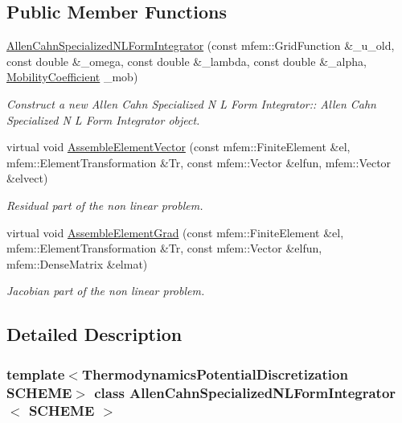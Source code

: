 \subsection*{Public Member Functions}
\begin{DoxyCompactItemize}
\item 
\hyperlink{classAllenCahnSpecializedNLFormIntegrator_abb6bd9b866d9d5777cd4f72d7aceb6c1}{Allen\+Cahn\+Specialized\+N\+L\+Form\+Integrator} (const mfem\+::\+Grid\+Function \&\+\_\+u\+\_\+old, const double \&\+\_\+omega, const double \&\+\_\+lambda, const double \&\+\_\+alpha, \hyperlink{classMobilityCoefficient}{Mobility\+Coefficient} \+\_\+mob)
\begin{DoxyCompactList}\small\item\em Construct a new Allen Cahn Specialized N L Form Integrator\+:\+: Allen Cahn Specialized N L Form Integrator object. \end{DoxyCompactList}\item 
virtual void \hyperlink{classAllenCahnSpecializedNLFormIntegrator_a8bcdb2dcc40d2218465b7dd2d816990d}{Assemble\+Element\+Vector} (const mfem\+::\+Finite\+Element \&el, mfem\+::\+Element\+Transformation \&Tr, const mfem\+::\+Vector \&elfun, mfem\+::\+Vector \&elvect)
\begin{DoxyCompactList}\small\item\em Residual part of the non linear problem. \end{DoxyCompactList}\item 
virtual void \hyperlink{classAllenCahnSpecializedNLFormIntegrator_ad770c969c54e85b5e96cd284adda3f06}{Assemble\+Element\+Grad} (const mfem\+::\+Finite\+Element \&el, mfem\+::\+Element\+Transformation \&Tr, const mfem\+::\+Vector \&elfun, mfem\+::\+Dense\+Matrix \&elmat)
\begin{DoxyCompactList}\small\item\em Jacobian part of the non linear problem. \end{DoxyCompactList}\end{DoxyCompactItemize}


\subsection{Detailed Description}
\subsubsection*{template$<$Thermodynamics\+Potential\+Discretization S\+C\+H\+E\+ME$>$\newline
class Allen\+Cahn\+Specialized\+N\+L\+Form\+Integrator$<$ S\+C\+H\+E\+M\+E $>$}



